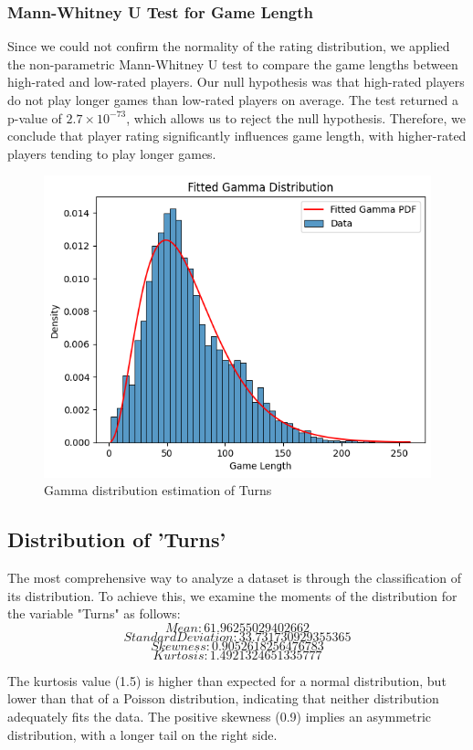 \documentclass[conference]{IEEEtran}
\begin{document}
\subsubsection*{Mann-Whitney U Test for Game Length}
Since we could not confirm the normality of the rating distribution, we applied the non-parametric Mann-Whitney U test to compare the game lengths between high-rated and low-rated players. Our null hypothesis was that high-rated players do not play longer games than low-rated players on average. The test returned a p-value of \(2.7 \times 10^{-73}\), which allows us to reject the null hypothesis. Therefore, we conclude that player rating significantly influences game length, with higher-rated players tending to play longer games.


\begin{figure}[H]
    \centering
    \includegraphics[width=0.8\linewidth]{gamma_fit.png}
    \caption{Gamma distribution estimation of Turns}
    \label{fig:gamma_fit}
\end{figure}
\subsection{Distribution of 'Turns'}

The most comprehensive way to analyze a dataset is through the classification of its distribution. To achieve this, we examine the moments of the distribution for the variable "Turns" as follows:
\[Mean: 61.96255029402662\]
\[Standard Deviation: 33.731730929355365\]
\[Skewness: 0.9052618256476783\]
\[Kurtosis: 1.4921324651335777\]

The kurtosis value (1.5) is higher than expected for a normal distribution, but lower than that of a Poisson distribution, indicating that neither distribution adequately fits the data. The positive skewness (0.9) implies an asymmetric distribution, with a longer tail on the right side.
\end{document}
